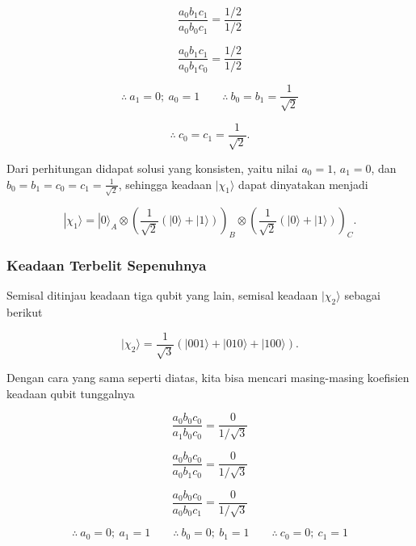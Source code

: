 \begin{equation}
\frac{a_0 b_1 c_1}{a_0 b_0 c_1}
=
\frac{1/2}{1/2}
\end{equation}

\begin{equation}
\frac{a_0 b_1 c_1}{a_0 b_1 c_0}
=
\frac{1/2}{1/2}
\end{equation}

\[
\therefore \ a_1 = 0 ; \ a_0 = 1
\qquad
\therefore \ b_0 = b_1 = \frac{1}{\sqrt{2}}
\]

\[
\therefore \ c_0 = c_1 = \frac{1}{\sqrt{2}} .
\]

Dari perhitungan didapat solusi yang konsisten, yaitu nilai
$a_0 = 1$, $a_1 = 0$, dan $b_0 = b_1 = c_0 = c_1 = \frac{1}{\sqrt{2}}$, sehingga keadaan $|\chi_1\rangle$ dapat dinyatakan menjadi

\begin{equation}
|\chi_1\rangle
=
|0\rangle_A \otimes
\left(
\frac{1}{\sqrt{2}}
(|0\rangle + |1\rangle)
\right)_B
\otimes
\left(
\frac{1}{\sqrt{2}}
(|0\rangle + |1\rangle)
\right)_C .
\end{equation}

\subsubsection{Keadaan Terbelit Sepenuhnya}

Semisal ditinjau keadaan tiga qubit yang lain, semisal keadaan $|\chi_2\rangle$ sebagai berikut

\begin{equation}
|\chi_2\rangle =
\frac{1}{\sqrt{3}}
\left(
|001\rangle + |010\rangle + |100\rangle
\right) .
\end{equation}

Dengan cara yang sama seperti diatas, kita bisa mencari masing-masing koefisien keadaan qubit tunggalnya

\begin{equation}
\frac{a_0 b_0 c_0}{a_1 b_0 c_0}
=
\frac{0}{1/\sqrt{3}}
\end{equation}

\begin{equation}
\frac{a_0 b_0 c_0}{a_0 b_1 c_0}
=
\frac{0}{1/\sqrt{3}}
\end{equation}

\begin{equation}
\frac{a_0 b_0 c_0}{a_0 b_0 c_1}
=
\frac{0}{1/\sqrt{3}}
\end{equation}

\[
\therefore \ a_0 = 0 ; \ a_1 = 1
\qquad
\therefore \ b_0 = 0 ; \ b_1 = 1
\qquad
\therefore \ c_0 = 0 ; \ c_1 = 1
\]

